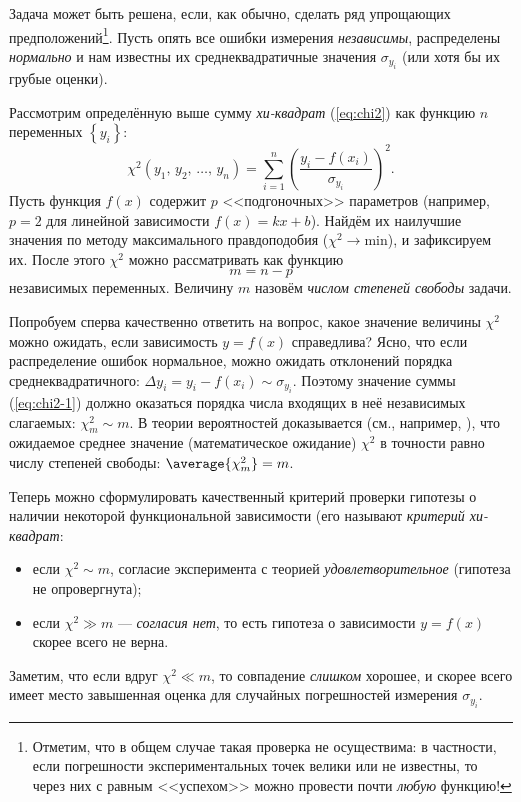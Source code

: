 Задача может быть решена, если, как обычно, сделать ряд упрощающих
предположений\footnote{Отметим, что в общем случае такая проверка не осуществима:
в частности, если погрешности экспериментальных точек велики или не
известны, то через них с равным <<успехом>>
можно провести почти \emph{любую} функцию!}. 
Пусть опять все ошибки измерения \emph{независимы},
распределены \emph{нормально} и нам известны их
среднеквадратичные значения $\sigma_{y_{i}}$ 
(или хотя бы их грубые оценки).

Рассмотрим определённую выше сумму \emph{хи-квадрат} (\ref{eq:chi2}) 
как функцию $n$ переменных $\left\{ y_{i}\right\}$:
\begin{equation}
\chi^{2}\!\left(y_{1},\,y_{2},\,\ldots,\,y_{n}\right)=\sum\limits _{i=1}^{n}\left(\frac{y_{i}-f\!\left(x_{i}\right)}{\sigma_{y_{i}}}\right)^{2}.\label{eq:chi2-1}
\end{equation}
Пусть функция $f\!\left(x\right)$ содержит $p$ <<подгоночных>>
параметров (например, $p=2$ для линейной зависимости $f\!\left(x\right)=kx+b$).
Найдём их наилучшие значения по методу максимального правдоподобия
($\chi^{2}\to\mathrm{min}$), и зафиксируем их. После этого $\chi^{2}$
можно рассматривать как функцию 
\[
m=n-p
\]
независимых переменных. Величину $m$ назовём \emph{числом степеней свободы} задачи.

Попробуем сперва качественно ответить на вопрос, какое значение
величины $\chi^{2}$ можно ожидать, если зависимость $y=f\!\left(x\right)$
справедлива? Ясно, что если распределение ошибок нормальное, можно
ожидать отклонений порядка среднеквадратичного: $\Delta y_{i}=y_{i}-f\!\left(x_{i}\right)\sim\sigma_{y_{i}}$.
Поэтому значение суммы (\ref{eq:chi2-1}) должно оказаться порядка
числа входящих в неё независимых слагаемых: $\chi_{m}^{2}\sim m$.
В теории вероятностей доказывается (см., например, \cite{hudson}), что ожидаемое среднее значение (математическое ожидание) $\chi^{2}$ в точности равно числу степеней свободы: $\average{\chi_{m}^{2}}=m$.

Теперь можно сформулировать качественный критерий проверки
гипотезы о наличии некоторой функциональной зависимости (его называют
\emph{критерий хи-квадрат}:
\begin{itemize}
\item  если $\chi^{2}\sim m$, согласие эксперимента с теорией \emph{удовлетворительное}
(гипотеза не опровергнута); 
\item если $\chi^{2}\gg m$ --- \emph{согласия нет}, 
то есть гипотеза о зависимости $y=f\!\left(x\right)$ скорее всего не верна.
\end{itemize}
Заметим, что если вдруг $\chi^{2}\ll m$, то совпадение \emph{слишком}
хорошее, и скорее всего имеет место завышенная оценка для случайных
погрешностей измерения $\sigma_{y_{i}}$.

